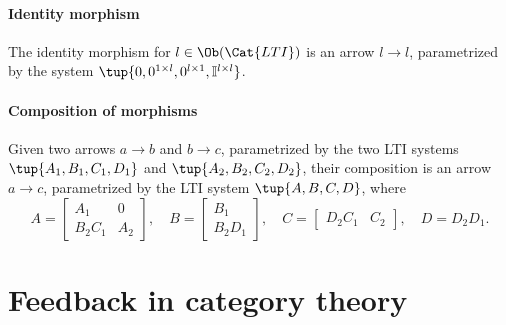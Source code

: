 \paragraph{Identity morphism}
The identity morphism for $l\in \Ob(\Cat{LTI})$ is an arrow $l\to l$, parametrized by the system $\tup{0,0^{1\times l},0^{l\times 1},\mathbb{I}^{l\times l}}$.

\paragraph{Composition of morphisms}
Given two arrows $a\to b$ and $b\to c$, parametrized by the two LTI systems $\tup{A_1,B_1,C_1,D_1}$ and $\tup{A_2,B_2,C_2,D_2}$, their composition is an arrow $a\to c$, parametrized by the LTI system $\tup{A,B,C,D}$, where
\begin{equation}
  A=\begin{bmatrix}
      A_1&0\\
      B_2C_1&A_2
  \end{bmatrix},\quad
  B=\begin{bmatrix}
      B_1\\
      B_2D_1
  \end{bmatrix},\quad
  C=\begin{bmatrix}
      D_2C_1&C_2
  \end{bmatrix}, \quad
  D=D_2D_1.
\end{equation}

\section{Feedback in category theory}


